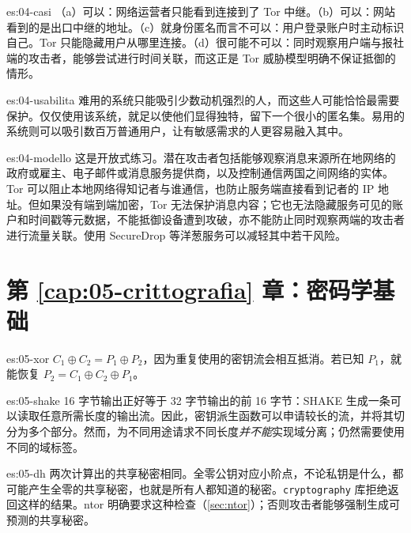 \begin{soluzione}{es:04-casi}
（a）可以：网络运营者只能看到连接到了 Tor 中继。（b）可以：网站看到的是出口中继的地址。（c）就身份匿名而言不可以：用户登录账户时主动标识自己。Tor 只能隐藏用户从哪里连接。（d）很可能不可以：同时观察用户端与报社端的攻击者，能够尝试进行时间关联，而这正是 Tor 威胁模型明确不保证抵御的情形。
\end{soluzione}

\begin{soluzione}{es:04-usabilita}
难用的系统只能吸引少数动机强烈的人，而这些人可能恰恰最需要保护。仅仅使用该系统，就足以使他们显得独特，留下一个很小的匿名集。易用的系统则可以吸引数百万普通用户，让有敏感需求的人更容易融入其中。
\end{soluzione}

\begin{soluzione}{es:04-modello}
这是开放式练习。潜在攻击者包括能够观察消息来源所在地网络的政府或雇主、电子邮件或消息服务提供商，以及控制通信两国之间网络的实体。Tor 可以阻止本地网络得知记者与谁通信，也防止服务端直接看到记者的 IP 地址。但如果没有端到端加密，Tor 无法保护消息内容；它也无法隐藏服务可见的账户和时间戳等元数据，不能抵御设备遭到攻破，亦不能防止同时观察两端的攻击者进行流量关联。使用 SecureDrop 等洋葱服务可以减轻其中若干风险。
\end{soluzione}

\section*{第 \ref{cap:05-crittografia} 章：密码学基础}

\begin{soluzione}{es:05-xor}
$C_1 \oplus C_2 = P_1 \oplus P_2$，因为重复使用的密钥流会相互抵消。若已知 $P_1$，就能恢复 $P_2=C_1\oplus C_2\oplus P_1$。
\end{soluzione}

\begin{soluzione}{es:05-shake}
16 字节输出正好等于 32 字节输出的前 16 字节：SHAKE 生成一条可以读取任意所需长度的输出流。因此，密钥派生函数可以申请较长的流，并将其切分为多个部分。然而，为不同用途请求不同长度\emph{并不能}实现域分离；仍然需要使用不同的域标签。
\end{soluzione}

\begin{soluzione}{es:05-dh}
两次计算出的共享秘密相同。全零公钥对应小阶点，不论私钥是什么，都可能产生全零的共享秘密，也就是所有人都知道的秘密。\texttt{cryptography} 库拒绝返回这样的结果。ntor 明确要求这种检查（\cref{sec:ntor}）；否则攻击者能够强制生成可预测的共享秘密。
\end{soluzione}

